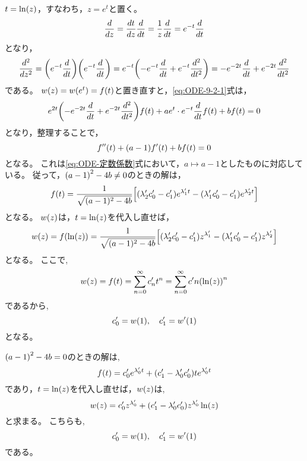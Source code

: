 \documentclass[a4paper,draft]{ltjsarticle}
\begin{document}
$t=\fun{\ln}{z}$，すなわち，$z=e^t$と置く。
\begin{equation}
    \frac{d }{d z}=\frac{d t}{d z}\frac{d }{d t}=\dfrac{1}{z}\frac{d }{d t}=e^{-t}\frac{d }{d t}
\end{equation}
となり，
\begin{equation}
    \diffn{}{z}{2}=\pare{e^{-t}\diff{}{t}}\pare{e^{-t}\diff{}{t}}
    =e^{-t}\pare{-e^{-t}\diff{}{t}+e^{-t}\diffn{}{t}{2}}
    =-e^{-2t}\diff{}{t}+e^{-2t}\diffn{}{t}{2}
\end{equation}
である。
$w\pare{z}=w\pare{e^t}=f\pare{t}$と置き直すと，\eqref{eq:ODE-9-2-1}式は，
\begin{equation}
    e^{2t}\pare{-e^{-2t}\diff{}{t}+e^{-2t}\diffn{}{t}{2}}f\pare{t}
    +ae^{t}\cdot e^{-t}\diff{}{t}f\pare{t}
    +bf\pare{t}=0
\end{equation}
となり，整理することで，
\begin{equation}
    f''\pare{t}+\pare{a-1}f'\pare{t}+bf\pare{t}=0
\end{equation}
となる。
これは\eqref{eq:ODE-定数係数}式において，$a\mapsto a-1$としたものに対応している。
従って，$\pare{a-1}^2-4b\ne0$のときの解は，
\begin{equation}
    f\pare{t}=\dfrac{1}{\sqrt{\spare{a-1}^2-4b}}\squ{\pare{\lambda'_2c'_0-c'_1}e^{\lambda'_1 t}-\pare{\lambda'_1 c'_0-c'_1}e^{\lambda'_2 t}}
\end{equation}
となる。
$w\pare{z}$は，$t=\fun{\ln}{z}$を代入し直せば，
\begin{equation}
    w\pare{z}=f\pare{\fun{\ln}{z}}=\dfrac{1}{\sqrt{\spare{a-1}^2-4b}}\squ{\pare{\lambda'_2c'_0-c'_1}z^{\lambda'_1}-\pare{\lambda'_1 c'_0-c'_1}z^{\lambda'_2}}
\end{equation}
となる。
ここで,
\begin{equation}
    w\pare{z}=f\pare{t}=\sum_{n=0}^\infty c'_n t^n =\sum_{n=0}^\infty c'n\pare{\fun{\ln}{z}}^n
\end{equation}
であるから,
\begin{equation}
    c'_0=w\pare{1},\quad c'_1=w'\pare{1}
\end{equation}
となる。

$\pare{a-1}^2-4b=0$のときの解は,
\begin{equation}
    f\pare{t}=c'_0e^{\lambda'_0 t}+\pare{c'_1-\lambda'_0c'_0}te^{\lambda'_0 t}
\end{equation}
であり，$t=\fun{\ln}{z}$を代入し直せば，$w\pare{z}$は,
\begin{equation}
    w\pare{z}=c'_0z^{\lambda'_0}+\pare{c'_1-\lambda'_0c'_0}z^{\lambda'_0}\fun{\ln}{z}
\end{equation}
と求まる。
こちらも,
\begin{equation}
    c'_0=w\pare{1},\quad c'_1=w'\pare{1}
\end{equation}
である。
\end{document}
